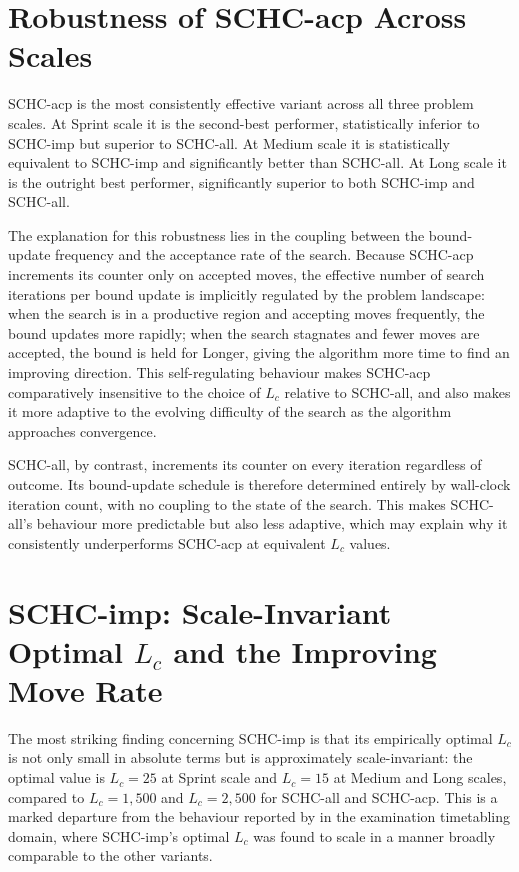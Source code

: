 \documentclass[12pt, a4paper, oneside]{report}
\begin{document}
\section{Robustness of SCHC-acp Across Scales}
\label{sec:disc_acp}

SCHC-acp is the most consistently effective variant across all three
problem scales. At Sprint scale it is the second-best performer,
statistically inferior to SCHC-imp but superior to SCHC-all. At
Medium scale it is statistically equivalent to SCHC-imp and
significantly better than SCHC-all. At Long scale it is the outright
best performer, significantly superior to both SCHC-imp and SCHC-all.

The explanation for this robustness lies in the coupling between the
bound-update frequency and the acceptance rate of the search. Because
SCHC-acp increments its counter only on accepted moves, the effective
number of search iterations per bound update is implicitly regulated
by the problem landscape: when the search is in a productive region
and accepting moves frequently, the bound updates more rapidly; when
the search stagnates and fewer moves are accepted, the bound is held
for Longer, giving the algorithm more time to find an improving
direction. This self-regulating behaviour makes SCHC-acp
comparatively insensitive to the choice of $L_c$ relative to
SCHC-all, and also makes it more adaptive to the evolving difficulty
of the search as the algorithm approaches convergence.

SCHC-all, by contrast, increments its counter on every iteration
regardless of outcome. Its bound-update schedule is therefore
determined entirely by wall-clock iteration count, with no coupling
to the state of the search. This makes SCHC-all's behaviour more
predictable but also less adaptive, which may explain why it
consistently underperforms SCHC-acp at equivalent $L_c$ values.

\section{SCHC-imp: Scale-Invariant Optimal $L_c$ and the Improving Move Rate}
\label{sec:disc_imp_lc}

The most striking finding concerning SCHC-imp is that its empirically
optimal $L_c$ is not only small in absolute terms but is
approximately scale-invariant: the optimal value is $L_c = 25$ at
Sprint scale and $L_c = 15$ at Medium and Long scales, compared to
$L_c = 1{,}500$ and $L_c = 2{,}500$ for SCHC-all and SCHC-acp. This
is a marked departure from the behaviour reported by \citet{Bykov2016}
in the examination timetabling domain, where SCHC-imp's optimal $L_c$
was found to scale in a manner broadly comparable to the other
variants.
\end{document}
